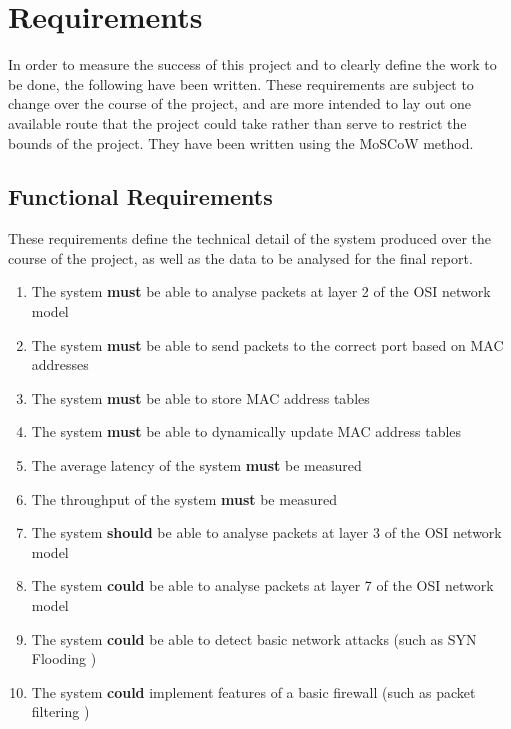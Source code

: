 \documentclass[12pt, a4paper, twoside, onecolumn]{article}
\begin{document}








\section{Requirements}
\label{requirements}
In order to measure the success of this project and to clearly define the work to be done, the following have been written. These requirements are subject to change over the course of the project, and are more intended to lay out one available route that the project could take rather than serve to restrict the bounds of the project. They have been written using the MoSCoW method.

\subsection{Functional Requirements}
\label{functional_requirements}

These requirements define the technical detail of the system produced over the course of the project, as well as the data to be analysed for the final report.
\begin{enumerate}[label=\textbf{F\arabic*:}]
  \item The system \textbf{must} be able to analyse packets at layer 2 of the OSI network model
  \item The system \textbf{must} be able to send packets to the correct port based on MAC addresses
  \item The system \textbf{must} be able to store MAC address tables
  \item The system \textbf{must} be able to dynamically update MAC address tables
  \item The average latency of the system \textbf{must} be measured
  \item The throughput of the system \textbf{must} be measured
  \item The system \textbf{should} be able to analyse packets at layer 3 of the OSI network model
  \item The system \textbf{could} be able to analyse packets at layer 7 of the OSI network model
  \item The system \textbf{could} be able to detect basic network attacks (such as SYN Flooding \cite{rfc4987})
  \item The system \textbf{could} implement features of a basic firewall (such as packet filtering \cite{rfc2979})
\end{enumerate}
\end{document}
